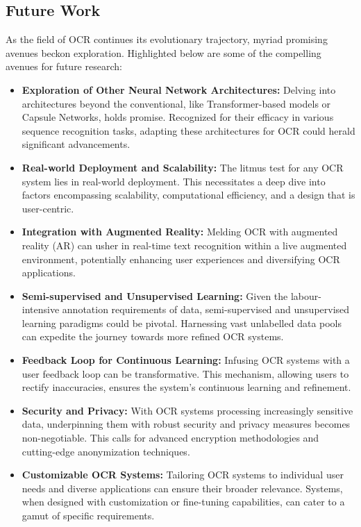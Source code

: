 \subsection{Future Work}

As the field of OCR continues its evolutionary trajectory, myriad promising avenues beckon exploration. Highlighted below are some of the compelling avenues for future research:

\begin{itemize}
    \item \textbf{Exploration of Other Neural Network Architectures:} Delving into architectures beyond the conventional, like Transformer-based models or Capsule Networks, holds promise. Recognized for their efficacy in various sequence recognition tasks, adapting these architectures for OCR could herald significant advancements.

    \item \textbf{Real-world Deployment and Scalability:} The litmus test for any OCR system lies in real-world deployment. This necessitates a deep dive into factors encompassing scalability, computational efficiency, and a design that is user-centric.

    \item \textbf{Integration with Augmented Reality:} Melding OCR with augmented reality (AR) can usher in real-time text recognition within a live augmented environment, potentially enhancing user experiences and diversifying OCR applications.

    \item \textbf{Semi-supervised and Unsupervised Learning:} Given the labour-intensive annotation requirements of data, semi-supervised and unsupervised learning paradigms could be pivotal. Harnessing vast unlabelled data pools can expedite the journey towards more refined OCR systems.

    \item \textbf{Feedback Loop for Continuous Learning:} Infusing OCR systems with a user feedback loop can be transformative. This mechanism, allowing users to rectify inaccuracies, ensures the system's continuous learning and refinement.

    \item \textbf{Security and Privacy:} With OCR systems processing increasingly sensitive data, underpinning them with robust security and privacy measures becomes non-negotiable. This calls for advanced encryption methodologies and cutting-edge anonymization techniques.

    \item \textbf{Customizable OCR Systems:} Tailoring OCR systems to individual user needs and diverse applications can ensure their broader relevance. Systems, when designed with customization or fine-tuning capabilities, can cater to a gamut of specific requirements.
\end{itemize}

